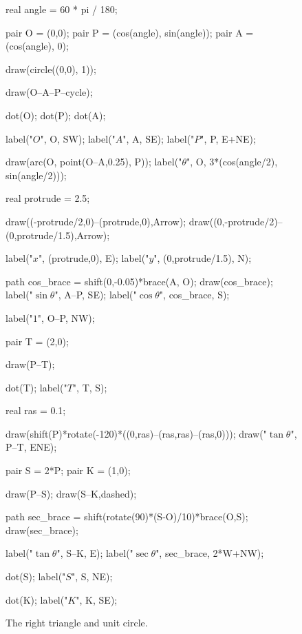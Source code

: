 \documentclass[../gatm_answers.tex]{subfiles}
\begin{document}
\begin{figure}[h]
	\begin{center}
		\begin{minipage}{\textwidth}
			\centering
			\begin{asy}[width=0.6\textwidth]
				real angle = 60 * pi / 180;
				
				pair O = (0,0);
				pair P = (cos(angle), sin(angle));
				pair A = (cos(angle), 0);
				
				draw(circle((0,0), 1));
				
				draw(O--A--P--cycle);
				
				dot(O);
				dot(P);
				dot(A);
				
				label("$O$", O, SW);
				label("$A$", A, SE);
				label("$P$", P, E+NE);
				
				draw(arc(O, point(O--A,0.25), P));
				label("$\theta$", O, 3*(cos(angle/2), sin(angle/2)));
				
				real protrude = 2.5;
				
				draw((-protrude/2,0)--(protrude,0),Arrow);
				draw((0,-protrude/2)--(0,protrude/1.5),Arrow);
				
				label("$x$", (protrude,0), E);
				label("$y$", (0,protrude/1.5), N);
				
				path cos_brace = shift(0,-0.05)*brace(A, O);
				draw(cos_brace);
				label("$\sin\theta$", A--P, SE);
				label("$\cos\theta$", cos_brace, S);
				
				label("$1$", O--P, NW);
				
				pair T = (2,0);
				
				draw(P--T);
				
				dot(T);
				label("$T$", T, S);
				
				real ras = 0.1;
				
				draw(shift(P)*rotate(-120)*((0,ras)--(ras,ras)--(ras,0)));
				draw("$\tan\theta$", P--T, ENE);
				
				pair S = 2*P;
				pair K = (1,0);
				
				draw(P--S);
				draw(S--K,dashed);
				
				path sec_brace = shift(rotate(90)*(S-O)/10)*brace(O,S);
				draw(sec_brace);
				
				label("$\tan\theta$", S--K, E);
				label("$\sec\theta$", sec_brace, 2*W+NW);
				
				dot(S);
				label("$S$", S, NE);
				
				dot(K);
				label("$K$", K, SE);
				
			
			\end{asy}
		\end{minipage}
	\end{center}

	\begin{center}
		\begin{minipage}{\textwidth}
			\caption{The right triangle and unit circle.}
			\label{fig:right_tri_unit_circ}
		\end{minipage}
	\end{center}
	\vspace*{-2\baselineskip}
\end{figure}
\end{document}
